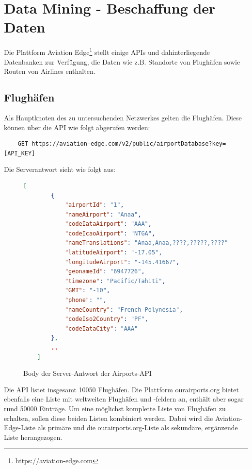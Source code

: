 \section{Data Mining - Beschaffung der Daten}

Die Plattform Aviation Edge\footnote{https://aviation-edge.com} stellt einige APIs und dahinterliegende Datenbanken
zur Verfügung, die Daten wie z.B. Standorte von Flughäfen sowie Routen von Airlines enthalten.

\subsection{Flughäfen}
\label{sec:airports}

Als Hauptknoten des zu untersuchenden Netzwerkes gelten die Flughäfen. Diese können über die API wie folgt abgerufen
werden:
\begin{lstlisting}
    GET https://aviation-edge.com/v2/public/airportDatabase?key=[API_KEY]
\end{lstlisting}
Die Serverantwort sieht wie folgt aus:

\begin{figure}[ht]
    \centering
    \begin{lstlisting}[language=json]
    [
        {
            "airportId": "1",
            "nameAirport": "Anaa",
            "codeIataAirport": "AAA",
            "codeIcaoAirport": "NTGA",
            "nameTranslations": "Anaa,Anaa,????,?????,????",
            "latitudeAirport": "-17.05",
            "longitudeAirport": "-145.41667",
            "geonameId": "6947726",
            "timezone": "Pacific/Tahiti",
            "GMT": "-10",
            "phone": "",
            "nameCountry": "French Polynesia",
            "codeIso2Country": "PF",
            "codeIataCity": "AAA"
        },
        ..
    ]

    \end{lstlisting}
    \caption{Body der Server-Antwort der Airports-API}
    \label{lst:AirportsAPIResponse}
\end{figure}

Die API listet insgesamt 10050 Flughäfen.
Die Plattform ourairports.org bietet ebenfalls eine Liste mit weltweiten Flughäfen und -feldern an, enthält aber sogar
rund 50000 Einträge.
Um eine möglichst komplette Liste von Flughäfen zu erhalten, sollen diese beiden Listen kombiniert werden.
Dabei wird die Aviation-Edge-Liste als primäre und die ourairports.org-Liste als sekundäre, ergänzende Liste herangezogen.


